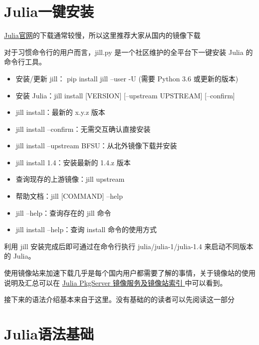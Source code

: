 \section{Julia一键安装}\label{sec1-2}

\href{https://julialang.org/downloads/}{Julia官网}的下载通常较慢，所以这里推荐大家从国内的镜像下载~

对于习惯命令行的用户而言，jill.py 是一个社区维护的全平台下一键安装 Julia 的命令行工具。

\begin{itemize}
    \tightlist
    \item 安装/更新 jill： pip install jill --user -U (需要 Python 3.6 或更新的版本)

    \item 安装 Julia：jill install [VERSION] [--upstream UPSTREAM] [--confirm]

    \item jill install：最新的 x.y.z 版本

    \item jill install --confirm：无需交互确认直接安装

    \item jill install --upstream BFSU：从北外镜像下载并安装

    \item jill install 1.4：安装最新的 1.4.z 版本

    \item 查询现存的上游镜像：jill upstream

    \item 帮助文档：jill [COMMAND] --help

    \item jill --help：查询存在的 jill 命令

    \item jill install --help：查询 install 命令的使用方式
\end{itemize}

利用 jill 安装完成后即可通过在命令行执行 julia/julia-1/julia-1.4 来启动不同版本的 Julia。

使用镜像站来加速下载几乎是每个国内用户都需要了解的事情，关于镜像站的使用说明及汇总可以在 \href{https://discourse.juliacn.com/t/topic/2969}{Julia PkgServer 镜像服务及镜像站索引 }中可以看到。

接下来的语法介绍基本来自于这里\cite{Julia2023}。没有基础的的读者可以先阅读这一部分~

\section{Julia语法基础}\label{sec1-3}

